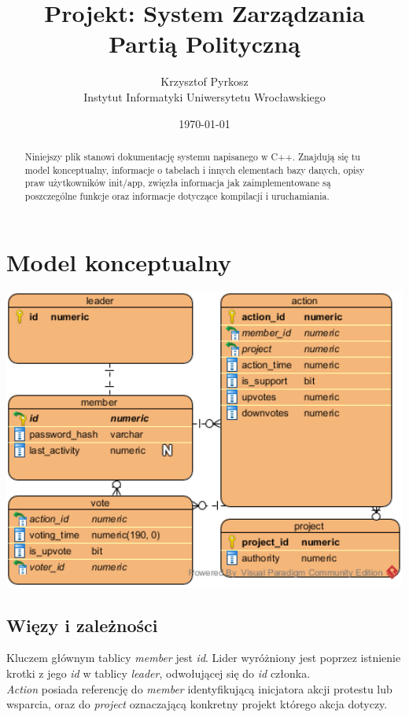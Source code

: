 \documentclass[12pt]{article}
\title{Projekt: System Zarządzania Partią Polityczną}
\author{Krzysztof Pyrkosz\\Instytut Informatyki Uniwersytetu Wrocławskiego}
\date{\today}
\begin{document}
\maketitle

\begin{abstract}
Niniejszy plik stanowi dokumentację systemu napisanego w C++. Znajdują się tu model konceptualny, informacje o tabelach i innych elementach bazy danych, opisy praw użytkowników init/app, zwięzła informacja jak zaimplementowane są poszczególne funkcje oraz informacje dotyczące kompilacji i uruchamiania.
\end{abstract}

\tableofcontents

\section{Model konceptualny}
\includegraphics[width=1\textwidth]{er-diagram.png}

\subsection{Więzy i zależności}
Kluczem głównym tablicy \textit{member} jest \textit{id}. Lider wyróżniony jest poprzez istnienie krotki z jego \textit{id} w tablicy \textit{leader}, odwołującej się do \textit{id} członka.\\

\textit{Action} posiada referencję do \textit{member} identyfikującą inicjatora akcji protestu lub wsparcia, oraz do \textit{project} oznaczającą konkretny projekt którego akcja dotyczy.\\
\end{document}
